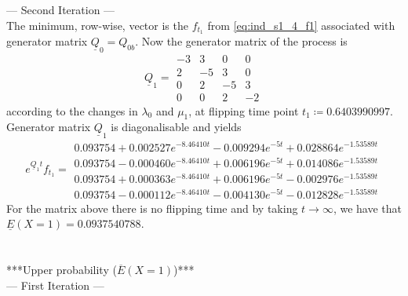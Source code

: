 \documentclass{article}
\begin{document}
--- Second Iteration ---\\
The minimum, row-wise, vector is the $f_{t_1}$ from \eqref{eq:ind_s1_4_f1} associated with generator matrix $\underline{Q}_{0}=Q_{0b}$.
Now the generator matrix of the process is
\begin{equation*} 
 \underline{Q}_{1}= 
 \begin{array}{|rrrr|}
  -3 & 3 & 0 & 0 \\
  2 & -5 & 3 & 0 \\
  0 & 2 & -5 & 3 \\
  0 & 0 & 2 & -2 
 \end{array}
 \end{equation*}
according to the changes in $\lambda_{0}$ and $\mu_{1}$, at flipping time point $t_{1}\coloneqq 0.6403990997$.
Generator matrix $\underline{Q}_1$ is diagonalisable and yields 
\begin{equation*} 
 e^{\underline{Q}_{1}t}f_{t_1}= 
 \begin{array}{|r|}
 0.093754+0.002527e^{-8.46410t}-0.009294e^{-5t}+0.028864e^{-1.53589t}\\
 0.093754-0.000460e^{-8.46410t}+0.006196e^{-5t}+0.014086e^{-1.53589t}\\
 0.093754+0.000363e^{-8.46410t}+0.006196e^{-5t}-0.002976e^{-1.53589t}\\
 0.093754-0.000112e^{-8.46410t}-0.004130e^{-5t}-0.012828e^{-1.53589t}  
 \end{array}
 \end{equation*}
For the matrix above there is no flipping time and by taking $t\to\infty$, we have that
$\underline{E}(X=1) = 0.0937540788$.\\\\\\


***Upper probability ($\overline{E}(X=1)$)***\\

--- First Iteration ---
\end{document}
